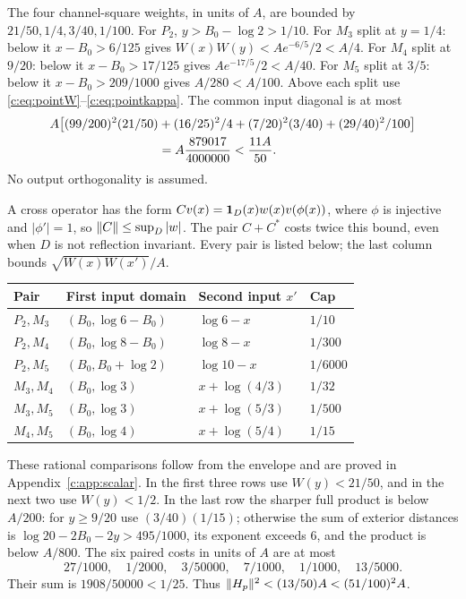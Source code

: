 \documentclass[11pt,a4paper]{article}
\numberwithin{equation}{section}
\theoremstyle{definition}\newtheorem{definition}[theorem]{Definition}
\theoremstyle{remark}\newtheorem{remark}[theorem]{Remark}
\begin{document}
The four channel-square weights, in units of $A$, are bounded by
$21/50,1/4,3/40,1/100$. For $P_2$, $y>{B_0}-\log2>1/10$.
For $M_3$ split at $y=1/4$: below it $x-{B_0}>6/125$ gives
$W(x)W(y)<Ae^{-6/5}/2<A/4$.
For $M_4$ split at $9/20$: below it $x-{B_0}>17/125$ gives $Ae^{-17/5}/2<A/40$.
For $M_5$ split at $3/5$: below it $x-{B_0}>209/1000$ gives $A/280<A/100$.
Above each split use \eqref{c:eq:pointW}--\eqref{c:eq:pointkappa}.
The common input diagonal is at most
\begin{align}
 A\bigl[(99/200)^2(21/50)&+(16/25)^2/4
 +(7/20)^2(3/40)+(29/40)^2/100\bigr]\notag\\
 &=A\frac{879017}{4000000}<\frac{11A}{50}.\label{c:eq:weighteddiag}
\end{align}
No output orthogonality is assumed.

A cross operator has the form $Cv(x)=\mathbf1_D(x)w(x)v(\phi(x))$,
where $\phi$ is injective and $|\phi'|=1$, so $\lVert C\rVert\le\sup_D|w|$.
The pair $C+C^*$ costs twice this bound, even when $D$ is not reflection invariant.
Every pair is listed below; the last column bounds $\sqrt{W(x)W(x')}/A$.
\begin{center}\small
\begin{tabular}{@{}llll@{}}\toprule
Pair & First input domain & Second input $x'$ & Cap\\\midrule
$P_2,M_3$ & $({B_0},\log6-{B_0})$ & $\log6-x$ & $1/10$\\
$P_2,M_4$ & $({B_0},\log8-{B_0})$ & $\log8-x$ & $1/300$\\
$P_2,M_5$ & $({B_0},{B_0}+\log2)$ & $\log10-x$ & $1/6000$\\
$M_3,M_4$ & $({B_0},\log3)$ & $x+\log(4/3)$ & $1/32$\\
$M_3,M_5$ & $({B_0},\log3)$ & $x+\log(5/3)$ & $1/500$\\
$M_4,M_5$ & $({B_0},\log4)$ & $x+\log(5/4)$ & $1/15$\\\bottomrule
\end{tabular}
\end{center}
These rational comparisons follow from the envelope and are proved in Appendix~\ref{c:app:scalar}. In the first three rows use $W(y)<21/50$, and in the next two use $W(y)<1/2$.
In the last row the sharper full product is below $A/200$:
for $y\ge9/20$ use $(3/40)(1/15)$; otherwise the sum of exterior distances is
$\log20-2{B_0}-2y>495/1000$, its exponent exceeds $6$, and the product is below $A/800$.
The six paired costs in units of $A$ are at most
\[
 27/1000,\quad1/2000,\quad3/50000,\quad7/1000,\quad1/1000,\quad13/5000.
\]
Their sum is $1908/50000<1/25$. Thus $\lVert H_p\rVert^2<(13/50)A<(51/100)^2A$.
\end{document}
